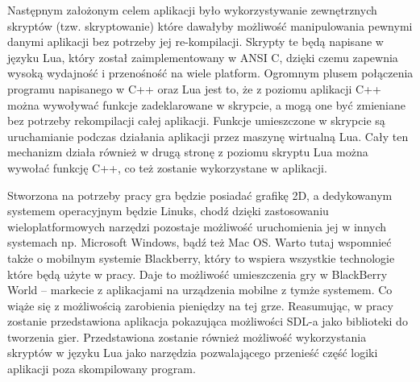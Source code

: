Następnym założonym celem aplikacji było wykorzystywanie zewnętrznych skryptów (tzw. skryptowanie) które dawałyby możliwość manipulowania pewnymi danymi aplikacji bez potrzeby jej re-kompilacji. Skrypty te będą napisane w języku Lua, który został zaimplementowany w ANSI C, dzięki czemu zapewnia wysoką wydajność i przenośność na wiele platform. Ogromnym plusem połączenia programu napisanego w C++ oraz Lua jest to, że z poziomu aplikacji C++ można wywoływać funkcje zadeklarowane w skrypcie, a mogą one być zmieniane bez potrzeby rekompilacji całej aplikacji. Funkcje umieszczone w skrypcie są uruchamianie podczas działania aplikacji przez maszynę wirtualną Lua. Cały ten mechanizm działa również w drugą stronę z poziomu skryptu Lua można wywołać funkcję C++, co też zostanie wykorzystane w aplikacji.

Stworzona na potrzeby pracy gra będzie posiadać grafikę 2D, a dedykowanym systemem operacyjnym będzie Linuks, chodź dzięki zastosowaniu wieloplatformowych narzędzi pozostaje możliwość uruchomienia jej w innych systemach np. Microsoft Windows, bądź też Mac OS. Warto tutaj wspomnieć także o mobilnym systemie Blackberry, który to wspiera wszystkie technologie które będą użyte w pracy. Daje to możliwość umieszczenia gry w BlackBerry World – markecie z aplikacjami na urządzenia mobilne z tymże systemem. Co wiąże się z możliwością zarobienia pieniędzy na tej grze. Reasumując, w pracy zostanie przedstawiona aplikacja pokazująca możliwości SDL-a jako biblioteki do tworzenia gier. Przedstawiona zostanie również możliwość wykorzystania skryptów w języku Lua jako narzędzia pozwalającego przenieść część logiki aplikacji poza skompilowany
program.

